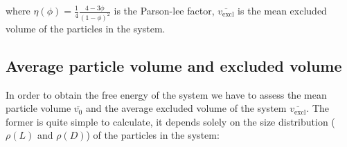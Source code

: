 \documentclass[journal=jacsat,manuscript=article]{achemso}
\begin{document}
where $\eta(\phi) = \frac{1}{4} \frac{4 - 3\phi}{(1 - \phi)^2}$ is the Parson-lee factor, $\overline{v_\mathrm{excl}}$ is the mean excluded volume of the particles in the system.

\subsection{Average particle volume and excluded volume}

In order to obtain the free energy of the system we have to assess the mean particle volume $\overline{v_0}$ and the average excluded volume of the system $\overline{v_\mathrm{excl}}$. The former is quite simple to calculate, it depends solely on the size distribution ($\rho(L)$ and $\rho(D)$) of the particles in the system:
\end{document}
